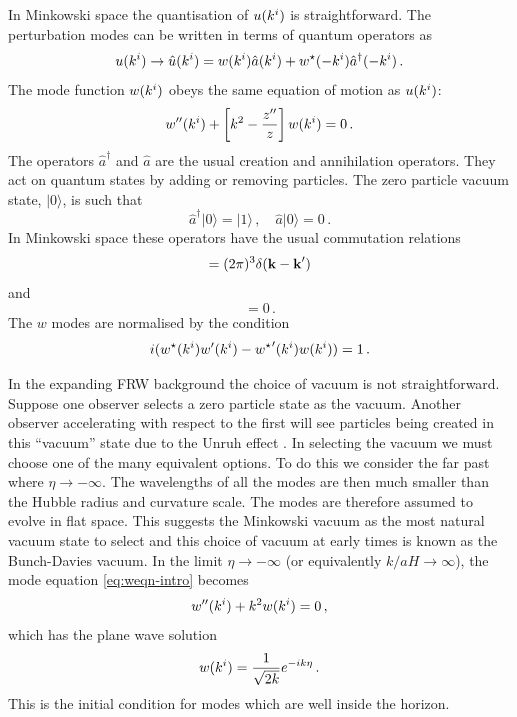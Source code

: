 In Minkowski space the quantisation of $u(k^i)$ is straightforward.
The perturbation modes can be written in terms of quantum operators as
% 
\begin{equation}
 u(k^i)\rightarrow\hat{u}(k^i) = 
  w(k^i) \hat{a}(k^i) + w^\star(-k^i)\hat{a}^\dagger(-k^i) \,.
\end{equation}
%
The mode function $w(k^i)$ obeys the same equation of motion as $u(k^i)$:
% 
\begin{equation}
\label{eq:weqn-intro}
 w''(k^i) + \left[ k^2 -\frac{z''}{z}\right]w(k^i) = 0\,.
\end{equation}
% 
The operators $\hat{a}^\dagger$ and $\hat{a}$ are the usual creation and
annihilation operators. They act on quantum states by adding or
removing particles. The zero particle vacuum state, $|0\rangle$, is such that
% 
\begin{equation}
 \hat{a}^\dagger|0\rangle = |1\rangle\,,\quad \hat{a}|0\rangle = 0\,.
\end{equation}
% 
In Minkowski space these operators have the usual commutation relations
% 
\begin{equation}
 [\hat{a}(\kb), \hat{a}^\dagger(\kb')] = (2\pi)^3 \delta(\kb -\kb') \\
\end{equation}
and
\begin{equation}
[\hat{a}(\kb), \hat{a}(\kb')] = 0\,.
\end{equation}
% 
The $w$ modes are normalised by the condition \cite{Mukhanov:2005sc}
% 
\begin{equation}
\label{eq:quantcondition-intro}
 i(w^\star(k^i)w'(k^i) - {w^{\star}}'(k^i)w(k^i)) = 1\,.
\end{equation}


In the expanding FRW background the choice of vacuum is not straightforward.
Suppose one observer selects a zero particle state as the vacuum. Another
observer accelerating with respect to the first will see particles being
created in this ``vacuum'' state due to the Unruh effect
\cite{Kinney2009, Unruh1976a}. In selecting the vacuum we must choose one of the
many equivalent options.
To do this we consider the far past where $\eta\rightarrow -\infty$. The wavelengths of all the
modes are then much smaller than the Hubble radius and curvature scale. The modes are
therefore assumed to evolve in flat space. This suggests the Minkowski vacuum as the
most natural vacuum state to select and this choice of vacuum at
early times is known as the Bunch-Davies vacuum.
% 
In the limit $\eta\rightarrow -\infty$ (or equivalently $k/aH\rightarrow \infty$),
the mode equation
\eqref{eq:weqn-intro} becomes
% 
\begin{equation}
  w''(k^i) + k^2 w(k^i) = 0\,,
\end{equation}
% 
which has the plane wave solution
% 
\begin{equation}
\label{eq:subhsoln-intro}
 w(k^i) = \frac{1}{\sqrt{2k}} e^{-ik\eta}\,.
\end{equation}
% 
This is the initial condition for modes which are well inside the horizon.

